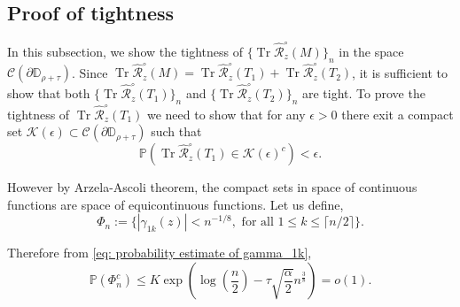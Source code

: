 \documentclass[12pt]{amsart}
\theoremstyle{plain}
\theoremstyle{definition}
\newcommand{\Tr}{\operatorname{Tr}}
\begin{document}
\subsection{Proof of tightness}
 In this subsection, we show the tightness of $\{\Tr \hat{\mathcal{R}}_{z}^{\circ}(M)\}_n$ in the space $\mathcal{C}(\partial{\mathbb{D}}_{\rho+\tau})$.
Since
$\Tr \hat{\mathcal{R}}_z^{\circ}(M) = \Tr \hat{\mathcal{R}}_z^{\circ}(T_1)+\Tr \hat{\mathcal{R}}_z^{\circ}(T_2)$, it is sufficient to show that both $\{\Tr \hat{\mathcal{R}}_z^{\circ}(T_1)\}_{n}$ and $\{\Tr \hat{\mathcal{R}}_z^{\circ}(T_2)\}_{n}$ are tight. To prove the tightness of $\Tr \hat{\mathcal{R}}_z^{\circ}(T_1)$ we need to show that for any $\epsilon>0$ there exit a compact set $\mathcal{K}(\epsilon)\subset \mathcal{C}(\partial{\mathbb{D}}_{\rho+\tau}) $ such that
\begin{equation}
    \mathbb{P}\left(\Tr \hat{\mathcal{R}}_z^{\circ}(T_1)\in \mathcal{K}(\epsilon)^c\right)< \epsilon. \label{eq: tightness main probability condition}
\end{equation}

However by Arzela-Ascoli theorem, the compact sets in space of continuous functions are space of equicontinuous functions. Let us define,
$$\Phi_n:= \{|\gamma_{1k}(z)|<n^{-1/8}, \text{  for all  } 1\leq k\leq \lceil n/2 \rceil \}.$$

Therefore from \eqref{eq: probability estimate of gamma_1k}, 
$$
\mathbb{P}(\Phi_n^c) \leq K  \exp{\left(\log\left(\frac{n}{2}\right)-\tau \sqrt{\frac{\alpha}{2 }} n^{\frac{3}{8}} \right)} = o(1).
$$
\end{document}

